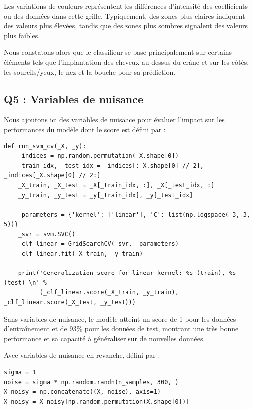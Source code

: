 \documentclass{scrartcl}
\begin{document}
Les variations de couleurs représentent les différences d'intensité des coefficients ou des données dans cette grille. Typiquement, des zones plus claires indiquent des valeurs plus élevées, tandis que des zones plus sombres signalent des valeurs plus faibles.\newline

Nous constatons alors que le classifieur se base principalement sur certains éléments tels que l'implantation des cheveux au-dessus du crâne et sur les côtés, les sourcils/yeux, le nez et la bouche pour sa prédiction.

\subsection{Q5 : Variables de nuisance}
\hspace{7pt} Nous ajoutons ici des variables de nuisance pour évaluer l'impact sur les performances du modèle dont le score est défini par :\newline
\begin{lstlisting}
def run_svm_cv(_X, _y):
    _indices = np.random.permutation(_X.shape[0])
    _train_idx, _test_idx = _indices[:_X.shape[0] // 2], _indices[_X.shape[0] // 2:]
    _X_train, _X_test = _X[_train_idx, :], _X[_test_idx, :]
    _y_train, _y_test = _y[_train_idx], _y[_test_idx]

    _parameters = {'kernel': ['linear'], 'C': list(np.logspace(-3, 3, 5))}
    _svr = svm.SVC()
    _clf_linear = GridSearchCV(_svr, _parameters)
    _clf_linear.fit(_X_train, _y_train)

    print('Generalization score for linear kernel: %s (train), %s (test) \n' %
          (_clf_linear.score(_X_train, _y_train), _clf_linear.score(_X_test, _y_test)))
\end{lstlisting}

Sans variables de nuisance, le modèle atteint un score de 1 pour les données d'entraînement et de 93\% pour les données de test, montrant une très bonne performance et sa capacité à généraliser sur de nouvelles données.\newline

Avec variables de nuisance en revanche, défini par :

\begin{lstlisting}
sigma = 1
noise = sigma * np.random.randn(n_samples, 300, )
X_noisy = np.concatenate((X, noise), axis=1)
X_noisy = X_noisy[np.random.permutation(X.shape[0])]
\end{lstlisting}
\end{document}
